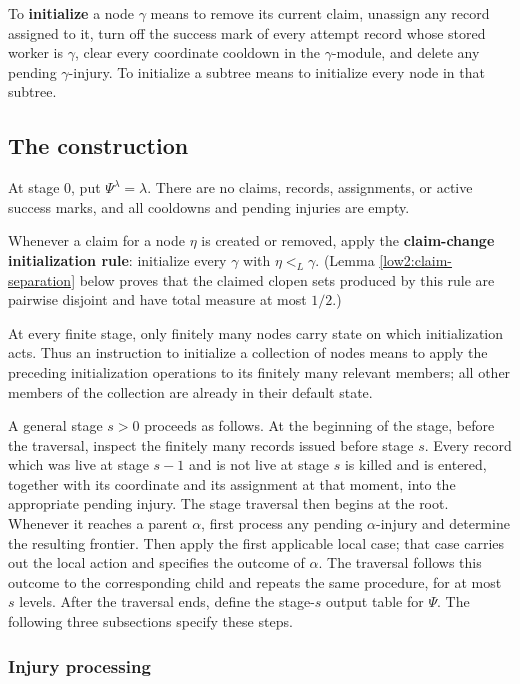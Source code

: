 \documentclass[11pt]{amsart}
\begin{document}
To \textbf{initialize} a node $\gamma$ means to remove its current claim,
unassign any record assigned to it, turn off the success mark of every attempt
record whose stored worker is $\gamma$, clear every coordinate cooldown in the
$\gamma$-module, and delete any pending $\gamma$-injury. To initialize a
subtree means to initialize every node in that subtree.

\subsection{The construction}

At stage $0$, put $\Psi^\lambda=\lambda$. There are no claims, records,
assignments, or active success marks, and all cooldowns and pending injuries
are empty.

Whenever a claim for a node $\eta$ is created or removed, apply the
\textbf{claim-change initialization rule}: initialize every $\gamma$ with
$\eta<_L\gamma$. (Lemma \ref{low2:claim-separation} below proves that the
claimed clopen sets produced by this rule are pairwise disjoint and have total
measure at most $1/2$.)

At every finite stage, only finitely many nodes carry state on which
initialization acts. Thus an instruction to initialize a collection of nodes
means to apply the preceding initialization operations to its finitely many
relevant members; all other members of the collection are already in their
default state.

A general stage $s>0$ proceeds as follows. At the beginning of the stage,
before the traversal, inspect the finitely many records issued before stage
$s$. Every record which was live at stage $s-1$ and is not live at stage $s$
is killed and is entered, together with its coordinate and its assignment at
that moment, into the appropriate pending injury. The stage traversal then
begins at the root. Whenever it reaches a parent $\alpha$, first process any
pending $\alpha$-injury and determine the resulting frontier. Then apply the
first applicable local case; that case carries out the local action and
specifies the outcome of $\alpha$. The traversal follows this outcome to the
corresponding child and repeats the same procedure, for at most $s$ levels.
After the traversal ends, define the stage-$s$ output table for $\Psi$. The
following three subsections specify these steps.

\subsubsection{Injury processing}
\end{document}
